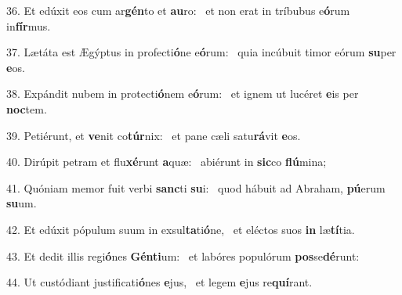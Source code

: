 36. Et edúxit eos cum ar\textbf{gén}to et \textbf{au}ro: \ast\  et non erat in tríbubus e\textbf{ó}rum in\textbf{fír}mus.\

37. Lætáta est Ægýptus in profecti\textbf{ó}ne e\textbf{ó}rum: \ast\  quia incúbuit timor eórum \textbf{su}per \textbf{e}os.\

38. Expándit nubem in protecti\textbf{ó}nem e\textbf{ó}rum: \ast\  et ignem ut lucéret \textbf{e}is per \textbf{noc}tem.\

39. Petiérunt, et \textbf{ve}nit co\textbf{túr}nix: \ast\  et pane cæli satu\textbf{rá}vit \textbf{e}os.\

40. Dirúpit petram et flu\textbf{xé}runt \textbf{a}quæ: \ast\  abiérunt in \textbf{sic}co \textbf{flú}mina;\

41. Quóniam memor fuit verbi \textbf{sanc}ti \textbf{su}i: \ast\  quod hábuit ad Abraham, \textbf{pú}erum \textbf{su}um.\

42. Et edúxit pópulum suum in exsul\textbf{ta}ti\textbf{ó}ne, \ast\  et eléctos suos \textbf{in} læ\textbf{tí}tia.\

43. Et dedit illis regi\textbf{ó}nes \textbf{Gén}\textbf{ti}um: \ast\  et labóres populórum \textbf{pos}se\textbf{dé}runt:\

44. Ut custódiant justificati\textbf{ó}nes \textbf{e}jus, \ast\  et legem \textbf{e}jus re\textbf{quí}rant.\

